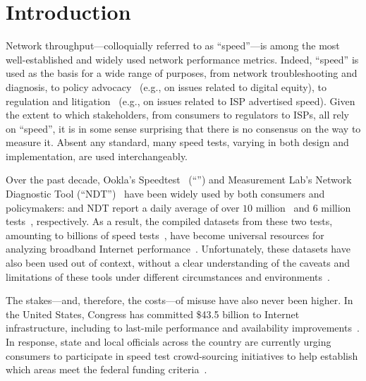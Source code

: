 \section{Introduction}\label{sec:intro}

Network throughput---colloquially referred to as ``speed''---is among the most
well-established and widely used network performance metrics.  Indeed, ``speed''
is used as the basis for a wide range of purposes, from network troubleshooting
and diagnosis, to policy
advocacy~\cite{ny-iht,battle-for-the-net,penn-rural-mlab,fcc-mba} (e.g., on
issues related to digital equity), to regulation and
litigation~\cite{fcc2022frontier} (e.g., on issues related to ISP advertised
speed).  Given the extent to which stakeholders, from consumers to regulators to
ISPs, all rely on ``speed'', it is in some sense surprising that there is no
consensus on the way to measure it. Absent any standard, many speed tests, varying in
both design and implementation, are used interchangeably. 

Over the past decade, Ookla's Speedtest~\cite{ookla2022speedtest} (``\ookla'')
and Measurement Lab's Network Diagnostic Tool (``NDT'')~\cite{mlab2022speedtest}
have been widely used by both consumers and policymakers: \ookla and NDT report
a daily average of over $10$ million~\cite{ookla2020ntests} and  $6$ million
tests~\cite{mlabs2020bigquery}, respectively. As a result, the compiled datasets
from these two tests, amounting to billions of speed
tests~\cite{ookla2020ntests,clark_measurement_2021}, have become universal
resources for analyzing broadband Internet performance~\cite{battle-for-the-net,
fcc2022frontier, ny-iht, penn-rural-mlab}. Unfortunately, these datasets have
also been used out of context, without a clear understanding of the caveats and
limitations of these tools under different circumstances and
environments~\cite{ookla-ny-case-study}. 

The stakes---and, therefore, the costs---of misuse have also never been higher. In the United
States, Congress has committed \$43.5 billion to Internet infrastructure,
including to last-mile performance and availability
improvements~\cite{infrastructure2022biden}. 
In response,
state and local officials across the country are currently urging consumers to
participate in speed test crowd-sourcing initiatives to help establish which
areas meet the federal funding criteria~\cite{idaho-speed-push}.


